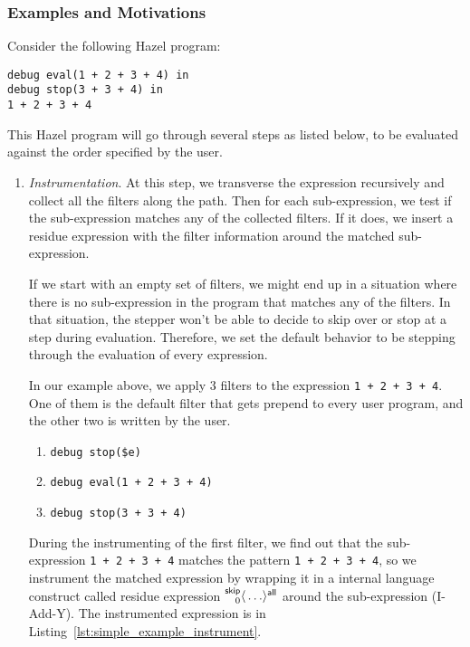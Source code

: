 
\subsubsection{Examples and Motivations}

Consider the following Hazel program:
\lstset{xleftmargin=1in}
\begin{lstlisting}[language=hazel,caption={A simple Hazel program}]
debug eval(1 + 2 + 3 + 4) in
debug stop(3 + 3 + 4) in
1 + 2 + 3 + 4\end{lstlisting}

This Hazel program will go through several steps as listed below, to
be evaluated against the order specified by the user.

\begin{enumerate}
\item \emph{Instrumentation}. \label{num:simple_example_instrument} At
  this step, we transverse the expression recursively and collect all
  the filters along the path. Then for each sub-expression, we test if
  the sub-expression matches any of the collected filters. If it does,
  we insert a residue expression with the filter information around
  the matched sub-expression.

  If we start with an empty set of filters, we might end up in a
  situation where there is no sub-expression in the program that
  matches any of the filters. In that situation, the stepper won't be
  able to decide to skip over or stop at a step during evaluation.
  Therefore, we set the default behavior to be stepping through the
  evaluation of every expression.

  In our example above, we apply 3 filters to the expression
  \lstinline[language=hazel]{1 + 2 + 3 + 4}. One of them is the
  default filter that gets prepend to every user program, and the
  other two is written by the user.

  \begin{enumerate}
  \item \lstinline[language=hazel]{debug stop($e)}
  \item \lstinline[language=hazel]{debug eval(1 + 2 + 3 + 4)}
  \item \lstinline[language=hazel]{debug stop(3 + 3 + 4)}
  \end{enumerate}

  During the instrumenting of the first filter, we find out that the
  sub-expression \lstinline[language=hazel]{1 + 2 + 3 + 4} matches the
  pattern \lstinline[language=hazel]{1 + 2 + 3 + 4}, so we instrument
  the matched expression by wrapping it in a internal language
  construct called residue expression
  \(\prescript{\mathsf{skip}}{0}{\langle} \ldots \rangle^{\mathsf{all}}\) around the sub-expression
  (I-Add-Y). The instrumented expression is in Listing~\ref{lst:simple_example_instrument}.


\end{enumerate}
